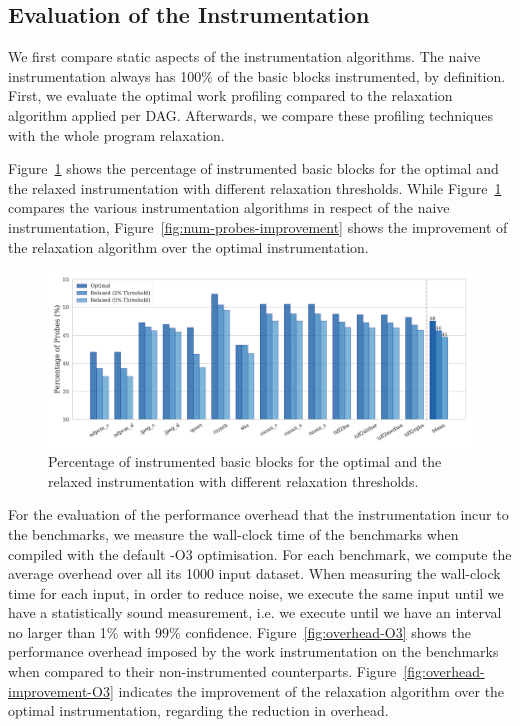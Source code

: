 \documentclass[sigplan,10pt]{acmart}
\theoremstyle{definition}
\newcommand{\flagstype}{\usefont{T1}{cmr}{m}{n}}
\begin{document}
\subsection{Evaluation of the Instrumentation}

We first compare static aspects of the instrumentation algorithms.
The naive instrumentation always has 100\% of the basic blocks instrumented, by definition.
First, we evaluate the optimal work profiling compared to the relaxation algorithm applied per DAG.
Afterwards, we compare these profiling techniques with the whole program relaxation.

Figure~\ref{fig:num-probes} shows the percentage of instrumented basic blocks for the optimal and the relaxed instrumentation with different relaxation thresholds.
While Figure~\ref{fig:num-probes} compares the various instrumentation algorithms in respect of the naive instrumentation, Figure~\ref{fig:num-probes-improvement} shows the improvement of the relaxation algorithm  over the optimal instrumentation.

\begin{figure}[ht]
    \centering
    \includegraphics[width=\textwidth]{figs/num-probes.pdf}
    \caption{Percentage of instrumented basic blocks for the optimal and the relaxed instrumentation with different relaxation thresholds.}
    \label{fig:num-probes}
\end{figure}

For the evaluation of the performance overhead that the instrumentation incur to the benchmarks, we measure the wall-clock time of the benchmarks when compiled with the default {\flagstype -O3} optimisation.
For each benchmark, we compute the average overhead over all its 1000 input dataset.
When measuring the wall-clock time for each input, in order to reduce noise, we execute the same input until we have a statistically sound measurement, i.e. we execute until we have an interval no larger than 1\% with 99\% confidence.
Figure~\ref{fig:overhead-O3} shows the performance overhead imposed by the work instrumentation on the benchmarks when compared to their non-instrumented counterparts.
Figure~\ref{fig:overhead-improvement-O3} indicates the improvement of the relaxation algorithm over the optimal instrumentation, regarding the reduction in overhead.
\end{document}
